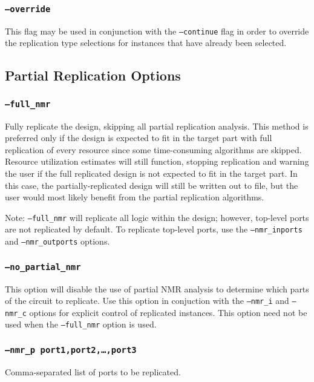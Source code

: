 \subsubsection{\texttt{--override}}
This flag may be used in conjunction with the \texttt{--continue} flag in order
to override the replication type selections for instances that have already been
selected.

\subsection{Partial Replication Options}

\subsubsection{\texttt{--full\_nmr}}
Fully replicate the design, skipping all partial replication analysis. This
method is preferred only if the design is expected to fit in the target part with full 
replication of every resource since some time-consuming algorithms are skipped.
Resource utilization estimates will still function, stopping replication and 
warning the user if the full replicated design is not expected to fit in the 
target part. In this case, the partially-replicated design will still be 
written out to file, but the user would most likely benefit from the partial 
replication algorithms.

Note: \texttt{--full\_nmr} will replicate all logic within the design; however, 
top-level ports are not replicated by default. To replicate top-level ports,
use the \texttt{--nmr\_inports} and \texttt{--nmr\_outports} options.

\subsubsection{\texttt{--no\_partial\_nmr}}
This option will disable the use of partial NMR analysis to determine which
parts of the circuit to replicate. Use this option in conjuction with the
\texttt{--nmr\_i} and \texttt{--nmr\_c} options for explicit control of
replicated instances. This option need not be used when the \texttt{--full\_nmr}
option is used.

\subsubsection{\texttt{--nmr\_p port1,port2,\ldots,port3}}
Comma-separated list of ports to be replicated.

